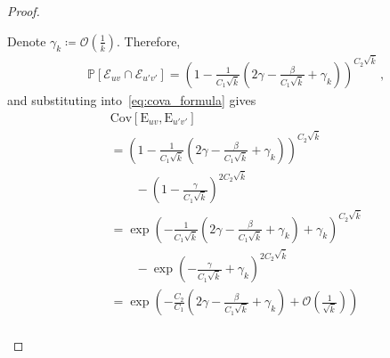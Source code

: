 \documentclass[journal]{IEEEtran}
\newcommand{\Cov}{\mathrm{Cov}}
\theoremstyle{definition}
\theoremstyle{definition}
\newcommand{\Ec}{\mathcal{E}}
\newcommand{\PP}{\mathbb{P}}
\newcommand{\rE}{\mathrm{E}}
\newcommand{\kb}{\overline{k}}
\newcommand{\bigO}{\mathcal{O}}
\begin{document}
\begin{proof}
\begin{enumerate}
Denote $\gamma_k \coloneqq \bigO\!\left(\frac{1}{\kb}\right)$. Therefore,
\begin{align*}
    &\PP[\Ec_{uv} \cap \Ec_{u'v'}] 
    = \left( 1 - \frac{1}{C_1 \sqrt{\kb}} \left(2\gamma 
       - \frac{\beta}{C_1 \sqrt{\kb}} + \gamma_k \right)
       \right)^{C_2 \sqrt{\kb}} \,,
\end{align*}
and substituting into~\eqref{eq:cova_formula} gives
\begin{align}
    &\Cov[\rE_{uv}, \rE_{u'v'}] \nonumber \\
    &= \left( 1 - \frac{1}{C_1 \sqrt{\kb}} \left(2\gamma 
       - \frac{\beta}{C_1 \sqrt{\kb}} + \gamma_k \right) 
       \right)^{C_2 \sqrt{\kb}} \nonumber \\
    &\qquad - \left( 1 - \frac{\gamma}{C_1 \sqrt{\kb}} 
       \right)^{2 C_2 \sqrt{\kb}} \nonumber \\
    &= \exp \left(-\frac{1}{C_1 \sqrt{\kb}} \left(2\gamma 
       - \frac{\beta}{C_1 \sqrt{\kb}} + \gamma_k \right) 
       + \gamma_k \right)^{C_2 \sqrt{\kb}} \nonumber \\
    &\qquad - \exp \left(-\frac{\gamma}{C_1 \sqrt{\kb}} 
       + \gamma_k \right)^{2C_2 \sqrt{\kb}} \nonumber \\
    &= \exp \left(-\frac{C_2}{C_1} \left(2\gamma - \frac{\beta}{C_1 \sqrt{\kb}} 
       + \gamma_k \right) 
       + \bigO \left(\frac{1}{\sqrt{\kb}} \right) \right) \nonumber \\

\end{align}
\end{enumerate}
\end{proof}
\end{document}
